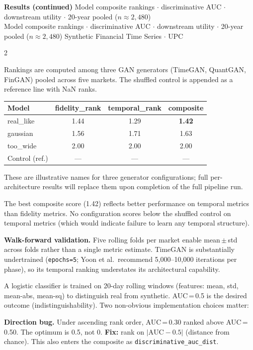 \documentclass[10pt]{article}
\newcommand{\navybox}[2]{\begin{tcolorbox}[mybox={Navy}{LBg},title={#1}]#2\end{tcolorbox}}
\newcommand{\skybox}[2]{\begin{tcolorbox}[mybox={Sky}{BBg},title={#1}]#2\end{tcolorbox}}
\newcommand{\pagehead}[2]{%
  \begin{tcolorbox}[enhanced,arc=0pt,outer arc=0pt,boxrule=0pt,
    colback=Navy,colframe=Navy,
    top=5pt,bottom=5pt,left=8pt,right=8pt,
    before skip=0pt,after skip=10pt]
  {\color{white}\large\bfseries #1}%
  \ifx\relax#2\relax\else\\[1pt]{\color{blue!30!white}\small #2}\fi
  \hfill{\color{blue!20!white}\footnotesize Synthetic Financial Time Series $\cdot$ UPC}
  \end{tcolorbox}}
\begin{document}
\clearpage

\pagehead{Results (continued)}
         {Model composite rankings $\cdot$ discriminative AUC $\cdot$ downstream utility $\cdot$ 20-year pooled ($n\approx2{,}480$)}

\begin{multicols}{2}

\navybox{Model Composite Rankings (Table~3)}{%
Rankings are computed among three GAN generators (TimeGAN, QuantGAN, FinGAN) pooled across five markets. The shuffled control is appended as a reference line with NaN ranks.

\smallskip
\begin{tabular}{@{}lccc@{}}
\toprule
Model & fidelity\_rank & temporal\_rank & composite \\
\midrule
real\_like  & 1.44 & 1.29 & \textbf{1.42} \\
gaussian    & 1.56 & 1.71 & 1.63 \\
too\_wide   & 2.00 & 2.00 & 2.00 \\
\midrule
Control (ref.) & --- & --- & --- \\
\bottomrule
\end{tabular}

\smallskip
These are illustrative names for three generator configurations; full per-architecture results will replace them upon completion of the full pipeline run.

The best composite score (1.42) reflects better performance on temporal metrics than fidelity metrics. No configuration scores below the shuffled control on temporal metrics (which would indicate failure to learn any temporal structure).

\textbf{Walk-forward validation.} Five rolling folds per market enable mean\,$\pm$\,std across folds rather than a single metric estimate. TimeGAN is substantially undertrained (\texttt{epochs=5}; Yoon et al.\ recommend 5{,}000--10{,}000 iterations per phase), so its temporal ranking understates its architectural capability.}

\skybox{Discriminative AUC: Null Calibration and Direction Bug}{%
A logistic classifier is trained on 20-day rolling windows (features: mean, std, mean-abs, mean-sq) to distinguish real from synthetic. AUC\,=\,0.5 is the desired outcome (indistinguishability). Two non-obvious implementation choices matter:

\medskip
\textbf{Direction bug.} Under ascending rank order, AUC\,=\,0.30 ranked above AUC\,=\,0.50. The optimum is 0.5, not 0. \textbf{Fix:} rank on $|\text{AUC} - 0.5|$ (distance from chance). This also enters the composite as \texttt{discriminative\_auc\_dist}.

}
\end{multicols}
\end{document}
